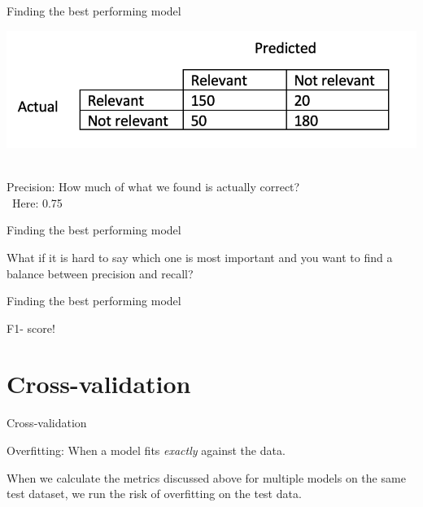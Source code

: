 \documentclass[handout]{beamer}
\begin{document}
\begin{frame}{Finding the best performing model}
	\begin{center}
		\includegraphics[width=\linewidth,height=\textheight,keepaspectratio]{../pictures/ConfusionMatrix2.png} \\\
	\end{center}
	
	Precision:  How much of what we found is actually correct? \\\
	Here: 0.75
	
	
\end{frame}


\begin{frame}{Finding the best performing model}

What if it is hard to say which one is most important and you want to find a balance between precision and recall?

		
\end{frame}


\begin{frame}{Finding the best performing model}

F1- score!
	
\end{frame}


\section{Cross-validation}

\begin{frame}{Cross-validation}
	
	Overfitting: When a model fits \emph{exactly} against the data.
	
	When we calculate the metrics discussed above for multiple models on the same test dataset, we run the risk of overfitting on the test data.
	
	
	
\end{frame}
\end{document}
